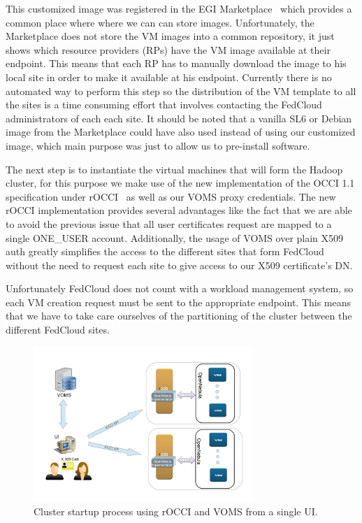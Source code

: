 \documentclass[oribibl]{llncs_Ibergrid2013}
\begin{document}
This customized image was registered in the EGI Marketplace~\cite{marketplace} which provides a common place where where we can can store images. Unfortunately, the Marketplace does not store the VM images into a common repository, it just shows which resource providers (RPs) have the VM image available at their endpoint. This means that each RP has to manually download the image to his local site in order to make it available at his endpoint. Currently there is no automated way to perform this step so the distribution of the VM template to all the sites is a time consuming effort that involves contacting the FedCloud administrators of each each site. It should be noted that a vanilla SL6 or Debian image from the Marketplace could have also used instead of using our customized image, which main purpose was just to allow us to pre-install software.


The next step is to instantiate the virtual machines that will form the Hadoop cluster, for this purpose we make use of the new implementation of the OCCI 1.1 specification under rOCCI~\cite{rocci} as well as our VOMS proxy credentials. The new rOCCI implementation provides several advantages like the fact that we are able to avoid the previous issue that all user certificates request are mapped to a single ONE\_USER account.
Additionally, the usage of VOMS over plain X509 auth greatly simplifies the access to the different sites that form FedCloud without the need to request each site to give access to our X509 certificate's DN.

Unfortunately FedCloud does not count with a workload management system, so each VM creation request must be sent to the appropriate endpoint. This means that we have to take care ourselves of the partitioning of the cluster between the different FedCloud sites.


\begin{figure}[h]
\centering
\includegraphics[width=0.74\textwidth]{figures/client-v2.png}
\caption{Cluster startup process using rOCCI and VOMS from a single UI.}
\label{fig:client}
\end{figure}
\end{document}
